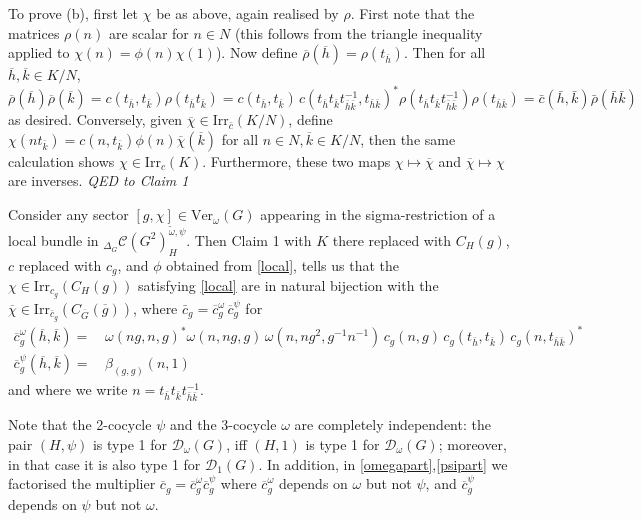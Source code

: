\documentclass[12pt]{article}
\numberwithin{equation}{section}
\def\cC            {{\mathcal{C}}}
\def\cD            {{\mathcal{D}}}
\begin{document}
To prove (b), first let $\chi$ be as above, again realised by  $\rho$. First note that 
 the matrices $\rho(n)$   are scalar for $n\in N$  (this follows from
the triangle inequality applied to $\chi(n)=\phi(n)\chi(1)$). Now define $\overline{\rho}(\overline{h})
=\rho({t_{\overline{h}}})$. Then for all $\overline{h},\overline{k}\in {K/N}$,
$$\overline{\rho}(\overline{h})\overline{\rho}(\overline{k})=c(t_{\bar{h}},t_{\bar{k}})\rho(t_{\bar{h}}t_{\bar{k}}) 
={c}(t_{\bar{h}},t_{\bar{k}})\,c(t_{\bar{h}}t_{\bar{k}}t^{-1}_{\bar{h}\bar{k}},t_{\bar{h}\bar{k}})^*\rho(t_{\bar{h}}t_{\bar{k}}t^{-1}_{\bar{h}\bar{k}})\rho(t_{\bar{h}\bar{k}})
=\bar{c}(\bar{h},\bar{k})\bar{\rho}(\bar{h}\bar{k})$$
as desired. Conversely, given $\overline{\chi}\in
 \mathrm{Irr}_{\bar{c}}(K/N)$, define $\chi(nt_{\bar{k}})=c(n,t_{\bar{k}}) \phi(n)\overline{\chi}(\overline{k})$ for all $n\in N,\overline{k}\in K/N$,
 then the same calculation shows $\chi\in\mathrm{Irr}_c(K)$. Furthermore, these two maps $\chi\mapsto\overline{\chi}$
 and $\overline{\chi}\mapsto\chi$ are inverses.  \qquad\textit{QED to Claim 1}\medskip


Consider any sector $[g,\chi]\in\mathrm{Ver}_\omega(G)$ appearing in the sigma-restriction of a local bundle in ${}_{\Delta_G}\cC(G^2)_H^{\tilde{\omega},\psi}$. Then Claim 1 with $K$ there replaced with $C_H(g)$, $c$ replaced with $c_g$, 
and $\phi$ obtained from \eqref{local}, tells us that the $\chi\in\mathrm{Irr}_{c_g}(C_H(g))$
satisfying \eqref{local} are in natural bijection with the  $\overline{\chi}\in\mathrm{Irr}_{\bar{c}_g}(C_{\overline{G}}(\overline{g}))$, where $\bar{c}_g=\overline{c}_g^\omega\,\overline{c}_g^\psi$ for
\begin{align}\label{omegapart}\overline{c}_g^\omega(\overline{h},\overline{k})=&\,\omega(ng, n, g)^*\omega(n, ng, g) \,\omega(n, ng^2, g^{-1}n^{-1})\, c_g(n, g)\,c_g(t_{\bar{h}},t_{\bar{k}})\,c_g(n,t_{\bar{h}\bar{k}})^*\\ \label{psipart}
\overline{c}_g^\psi(\overline{h},\overline{k})=&\,\beta_{(g,g)}(n,1)\end{align}
and where we write $n=t_{\bar{h}}t_{\bar{k}}t_{\bar{h}\bar{k}}^{-1}$. 


Note that the 2-cocycle $\psi$ and the 3-cocycle $\omega$ are completely independent:
the pair $(H,\psi)$ is type 1 for $\cD_\omega(G)$, iff $(H,1)$ is type 1 for $\cD_\omega(G)$; moreover, in that case it is also type 1 for $\cD_1(G)$. In addition, in \eqref{omegapart},\eqref{psipart} we factorised the multiplier $\overline{c}_g=\overline{c}_g^\omega\overline{c}_g^\psi$ where
$\overline{c}_g^\omega$ depends on $\omega$ but not $\psi$, and $\overline{c}_g^\psi$
depends on $\psi$ but not $\omega$.
\end{document}

